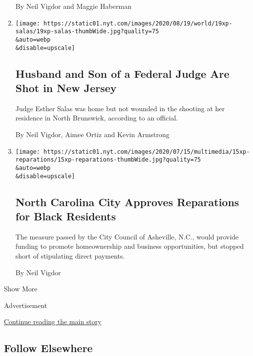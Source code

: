 \begin{enumerate}
  By Neil Vigdor and Maggie Haberman
\item
  \href{/2020/07/19/nyregion/shooting-nj-judge-esther-salas.html}{}

  \texttt{[image: https://static01.nyt.com/images/2020/08/19/world/19xp-salas/19xp-salas-thumbWide.jpg?quality=75\\\&auto=webp\\\&disable=upscale]}

  \hypertarget{husband-and-son-of-a-federal-judge-are-shot-in-new-jersey}{%
  \subsection{Husband and Son of a Federal Judge Are Shot in New
  Jersey}\label{husband-and-son-of-a-federal-judge-are-shot-in-new-jersey}}

  Judge Esther Salas was home but not wounded in the shooting at her
  residence in North Brunswick, according to an official.

  By Neil Vigdor, Aimee Ortiz and Kevin Armstrong
\item
  \href{/2020/07/16/us/reparations-asheville-nc.html}{}

  \texttt{[image: https://static01.nyt.com/images/2020/07/15/multimedia/15xp-reparations/15xp-reparations-thumbWide.jpg?quality=75\\\&auto=webp\\\&disable=upscale]}

  \hypertarget{north-carolina-city-approves-reparations-for-black-residents}{%
  \subsection{North Carolina City Approves Reparations for Black
  Residents}\label{north-carolina-city-approves-reparations-for-black-residents}}

  The measure passed by the City Council of Asheville, N.C., would
  provide funding to promote homeownership and business opportunities,
  but stopped short of stipulating direct payments.

  By Neil Vigdor
\end{enumerate}

Show More

Advertisement

\protect\hyperlink{after-mid2}{Continue reading the main story}

\hypertarget{follow-elsewhere}{%
\subsection{Follow Elsewhere}\label{follow-elsewhere}}

